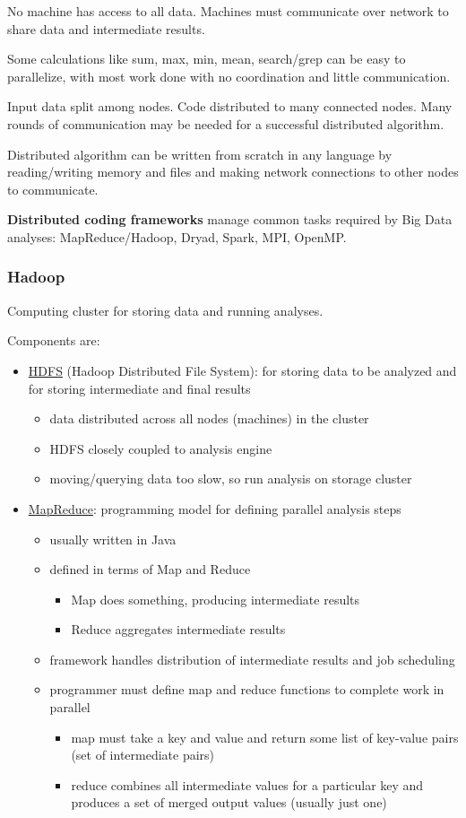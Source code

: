 \documentclass[11pt]{article}
\begin{document}
No machine has access to all data.
Machines must communicate over network to share data and intermediate results.

Some calculations like sum, max, min, mean, search/grep can be easy to
parallelize, with most work done with no coordination and little communication.

Input data split among nodes.
Code distributed to many connected nodes.
Many rounds of communication may be needed for a successful distributed
algorithm.

Distributed algorithm can be written from scratch in any language by
reading/writing memory and files and making network connections to other
nodes to communicate.

\textbf{Distributed coding frameworks} manage common tasks required by Big Data
analyses: MapReduce/Hadoop, Dryad, Spark, MPI, OpenMP.
\subsubsection{Hadoop}
\label{sec:org1ca03dc}
Computing cluster for storing data and running analyses.

Components are:
\begin{itemize}
\item \uline{HDFS} (Hadoop Distributed File System): for storing data to be
analyzed and for storing intermediate and final results
\begin{itemize}
\item data distributed across all nodes (machines) in the cluster
\item HDFS closely coupled to analysis engine
\item moving/querying data too slow, so run analysis on storage cluster
\end{itemize}
\item \uline{MapReduce}: programming model for defining parallel analysis steps
\begin{itemize}
\item usually written in Java
\item defined in terms of Map and Reduce
\begin{itemize}
\item Map does something, producing intermediate results
\item Reduce aggregates intermediate results
\end{itemize}
\item framework handles distribution of intermediate results and job
scheduling
\item programmer must define map and reduce functions to complete work
in parallel
\begin{itemize}
\item map must take a key and value and return some list of
key-value pairs (set of intermediate pairs)
\item reduce combines all intermediate values for a particular
key and produces a set of merged output values (usually
just one)
\end{itemize}
\end{itemize}
\end{itemize}
\end{document}
